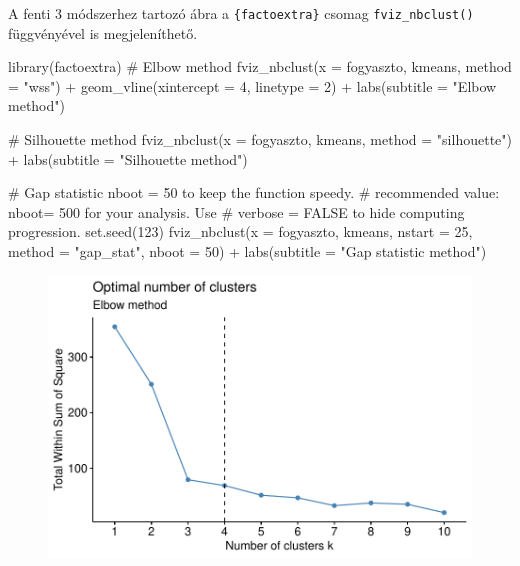 \documentclass[
  letterpaper,
]{krantz}
\makeatletter
\newenvironment{Shaded}{\begin{snugshade}}{\end{snugshade}}
\newcommand{\AttributeTok}[1]{\textcolor[rgb]{0.40,0.45,0.13}{#1}}
\newcommand{\CommentTok}[1]{\textcolor[rgb]{0.37,0.37,0.37}{#1}}
\newcommand{\DecValTok}[1]{\textcolor[rgb]{0.68,0.00,0.00}{#1}}
\newcommand{\FunctionTok}[1]{\textcolor[rgb]{0.28,0.35,0.67}{#1}}
\newcommand{\NormalTok}[1]{\textcolor[rgb]{0.00,0.23,0.31}{#1}}
\newcommand{\SpecialCharTok}[1]{\textcolor[rgb]{0.37,0.37,0.37}{#1}}
\newcommand{\StringTok}[1]{\textcolor[rgb]{0.13,0.47,0.30}{#1}}
\newenvironment{kframe}{%
\medskip{}
\setlength{\fboxsep}{.8em}
 \def\at@end@of@kframe{}%
 \ifinner\ifhmode%
  \def\at@end@of@kframe{\end{minipage}}%
  \begin{minipage}{\columnwidth}%
 \fi\fi%
 \def\FrameCommand##1{\hskip\@totalleftmargin \hskip-\fboxsep
 \colorbox{shadecolor}{##1}\hskip-\fboxsep
     \hskip-\linewidth \hskip-\@totalleftmargin \hskip\columnwidth}%
 \MakeFramed {\advance\hsize-\width
   \@totalleftmargin\z@ \linewidth\hsize
   \@setminipage}}%
 {\par\unskip\endMakeFramed%
 \at@end@of@kframe}
\renewenvironment{Shaded}{\begin{kframe}}{\end{kframe}}
\makeatother
\begin{document}
A fenti 3 módszerhez tartozó ábra a \texttt{\{factoextra\}} csomag
\texttt{fviz\_nbclust()} függvényével is megjeleníthető.

\begin{Shaded}
\begin{Highlighting}[]
\FunctionTok{library}\NormalTok{(factoextra)}
\CommentTok{\# Elbow method}
\FunctionTok{fviz\_nbclust}\NormalTok{(}\AttributeTok{x =}\NormalTok{ fogyaszto, kmeans, }\AttributeTok{method =} \StringTok{"wss"}\NormalTok{) }\SpecialCharTok{+} \FunctionTok{geom\_vline}\NormalTok{(}\AttributeTok{xintercept =} \DecValTok{4}\NormalTok{,}
    \AttributeTok{linetype =} \DecValTok{2}\NormalTok{) }\SpecialCharTok{+} \FunctionTok{labs}\NormalTok{(}\AttributeTok{subtitle =} \StringTok{"Elbow method"}\NormalTok{)}

\CommentTok{\# Silhouette method}
\FunctionTok{fviz\_nbclust}\NormalTok{(}\AttributeTok{x =}\NormalTok{ fogyaszto, kmeans, }\AttributeTok{method =} \StringTok{"silhouette"}\NormalTok{) }\SpecialCharTok{+}
    \FunctionTok{labs}\NormalTok{(}\AttributeTok{subtitle =} \StringTok{"Silhouette method"}\NormalTok{)}

\CommentTok{\# Gap statistic nboot = 50 to keep the function speedy.}
\CommentTok{\# recommended value: nboot= 500 for your analysis.  Use}
\CommentTok{\# verbose = FALSE to hide computing progression.}
\FunctionTok{set.seed}\NormalTok{(}\DecValTok{123}\NormalTok{)}
\FunctionTok{fviz\_nbclust}\NormalTok{(}\AttributeTok{x =}\NormalTok{ fogyaszto, kmeans, }\AttributeTok{nstart =} \DecValTok{25}\NormalTok{, }\AttributeTok{method =} \StringTok{"gap\_stat"}\NormalTok{,}
    \AttributeTok{nboot =} \DecValTok{50}\NormalTok{) }\SpecialCharTok{+} \FunctionTok{labs}\NormalTok{(}\AttributeTok{subtitle =} \StringTok{"Gap statistic method"}\NormalTok{)}
\end{Highlighting}
\end{Shaded}

\begin{figure}[H]

{\centering \includegraphics{./sec_klaszter_files/figure-pdf/unnamed-chunk-9-1.pdf}

}

\end{figure}
\end{document}
